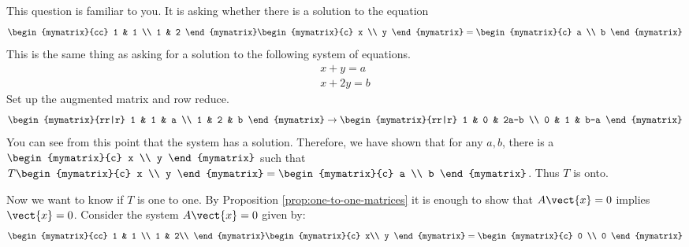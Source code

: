 \begin{solution}
This question is familiar to you. It is asking whether
there is a solution to the equation
\begin{equation*}
\begin{mymatrix}{cc}
1 & 1 \\
1 & 2
\end{mymatrix} \begin{mymatrix}{c}
x \\
y
\end{mymatrix} =\begin{mymatrix}{c}
a \\
b
\end{mymatrix}
\end{equation*}
This is the same thing as asking for a solution to the following system of
equations.
\begin{equation*}
\begin{array}{c}
x+y=a \\
x+2y=b
\end{array}
\end{equation*}
Set up the augmented matrix and row reduce.
\begin{equation}
\begin{mymatrix}{rr|r}
1 & 1 & a \\
1 & 2 & b
\end{mymatrix} \rightarrow \begin{mymatrix}{rr|r}
1 & 0 & 2a-b \\
0 & 1 & b-a
\end{mymatrix}
\label{ontomatrix}
\end{equation}
You can see from this point that the system has a solution. Therefore,
we have shown that for any $a, b$, there is a $
\begin{mymatrix}{c}
x \\
y
\end{mymatrix}$ such that $T\begin{mymatrix}{c}
x \\
y
\end{mymatrix} =\begin{mymatrix}{c}
a \\
b
\end{mymatrix}$.
Thus $T$ is onto.

Now we want to know if $T$ is one to one. 
By Proposition \ref{prop:one-to-one-matrices} it is enough to show that $A\vect{x}=0$ implies $\vect{x}=0$. 
Consider the system $A\vect{x}=0$ given by:
\begin{equation*}
\begin{mymatrix}{cc}
1 & 1 \\
1 & 2\\
\end{mymatrix}
\begin{mymatrix}{c}
x\\
y
\end{mymatrix}
=
\begin{mymatrix}{c}
0 \\
0
\end{mymatrix}
\end{equation*}


\end{solution}
